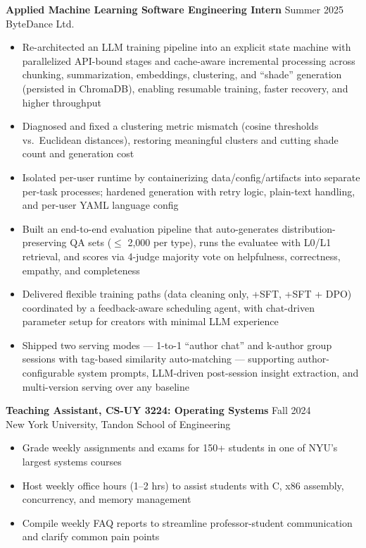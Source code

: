 \documentclass[letterpaper,10pt]{article}
\begin{document}
\textbf{Applied Machine Learning Software Engineering Intern} \hfill Summer 2025\\
ByteDance Ltd.
\begin{itemize}
  \item Re-architected an LLM training pipeline into an explicit state machine with parallelized API-bound stages and cache-aware incremental processing across chunking, summarization, embeddings, clustering, and ``shade'' generation (persisted in ChromaDB), enabling resumable training, faster recovery, and higher throughput
  \item Diagnosed and fixed a clustering metric mismatch (cosine thresholds vs.\ Euclidean distances), restoring meaningful clusters and cutting shade count and generation cost
  \item Isolated per-user runtime by containerizing data/config/artifacts into separate per-task processes; hardened generation with retry logic, plain-text handling, and per-user YAML language config
  \item Built an end-to-end evaluation pipeline that auto-generates distribution-preserving QA sets ($\leq$ 2{,}000 per type), runs the evaluatee with L0/L1 retrieval, and scores via 4-judge majority vote on helpfulness, correctness, empathy, and completeness
  \item Delivered flexible training paths (data cleaning only, +SFT, +SFT + DPO) coordinated by a feedback-aware scheduling agent, with chat-driven parameter setup for creators with minimal LLM experience
  \item Shipped two serving modes --- 1-to-1 ``author chat'' and k-author group sessions with tag-based similarity auto-matching --- supporting author-configurable system prompts, LLM-driven post-session insight extraction, and multi-version serving over any baseline
\end{itemize}

\textbf{Teaching Assistant, CS-UY 3224: Operating Systems} \hfill Fall 2024\\
New York University, Tandon School of Engineering
\begin{itemize}[leftmargin=*]
	\item Grade weekly assignments and exams for 150+ students in one of NYU’s largest systems courses
	\item Host weekly office hours (1–2 hrs) to assist students with C, x86 assembly, concurrency, and memory management
	\item Compile weekly FAQ reports to streamline professor-student communication and clarify common pain points
\end{itemize}
\end{document}
